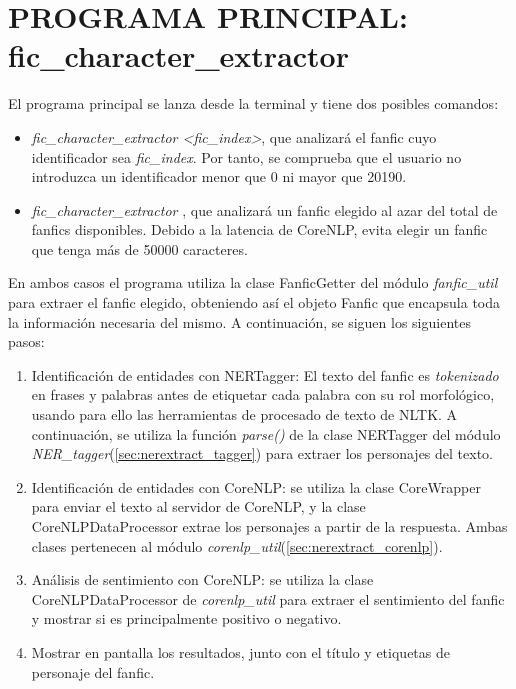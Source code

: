 \documentclass{pre-tfg}
\newcommand{\finalProgramName}{fic\_character\_extractor }
\begin{document}
\cleardoublepage
\section{PROGRAMA PRINCIPAL: fic\_character\_extractor }
\label{sec:main}

El programa principal se lanza desde la terminal y tiene dos posibles comandos:
\begin{itemize}
	\item \textit{\finalProgramName <fic\_index>}, que analizará el fanfic cuyo identificador sea \textit{fic\_index}. Por tanto, se comprueba que el usuario no introduzca un identificador menor que 0 ni mayor que 20190.
	\item \textit{\finalProgramName}, que analizará un fanfic elegido al azar del total de fanfics disponibles. Debido a la latencia de CoreNLP, evita elegir un fanfic que tenga más de 50000 caracteres.
\end{itemize}

En ambos casos el programa utiliza la clase FanficGetter del módulo \textit{fanfic\_util} para extraer el fanfic elegido, obteniendo así el objeto Fanfic que encapsula toda la información necesaria del mismo. A continuación, se siguen los siguientes pasos:

\begin{enumerate}
	\item Identificación de entidades con NERTagger: El texto del fanfic es \textit{tokenizado} en frases y palabras antes de etiquetar cada palabra con su rol morfológico, usando para ello las herramientas de procesado de texto de NLTK. A continuación, se utiliza la función \textit{parse()} de la clase NERTagger del módulo \textit{NER\_tagger}(\ref{sec:nerextract_tagger}) para extraer los personajes del texto.
	\item Identificación de entidades con CoreNLP: se utiliza la clase CoreWrapper para enviar el texto al servidor de CoreNLP, y la clase CoreNLPDataProcessor extrae los personajes a partir de la respuesta. Ambas clases pertenecen al módulo \textit{corenlp\_util}(\ref{sec:nerextract_corenlp}).
	\item Análisis de sentimiento con CoreNLP: se utiliza la clase CoreNLPDataProcessor de \textit{corenlp\_util} para extraer el sentimiento del fanfic y mostrar si es principalmente positivo o negativo.
	\item Mostrar en pantalla los resultados, junto con el título y etiquetas de personaje del fanfic.
\end{enumerate}
\end{document}
